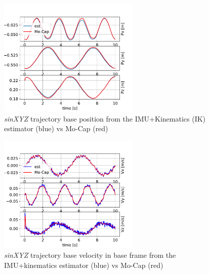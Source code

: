\begin{figure}[h]
    \centering
    \includegraphics[width=0.6\textwidth]{figures/centroidal/base_position_IK4.pdf}
    \caption{\textit{sinXYZ} trajectory base position from the IMU+Kinematics (IK) estimator (blue) vs Mo-Cap (red)}
    \label{fig:PosiIK4}
\end{figure}

\begin{figure}[h]
    \centering
    \includegraphics[width=0.6\textwidth]{figures/centroidal/base_velocity_base_frame_IK4.pdf}
    \caption{\textit{sinXYZ} trajectory base velocity in base frame from the IMU+kinematics estimator (blue) vs Mo-Cap (red)}
    \label{fig:VelIK4}
\end{figure}

